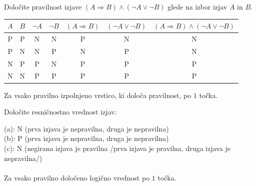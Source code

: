 \documentclass[addpoints]{exam}
\begin{document}
\begin{questions}

    
    \question[4]
    Določite pravilnost izjave $(A\Rightarrow  B)\land (\lnot A\lor \lnot B)$ glede na izbor izjav $A$ in $B$.

    \begin{solution}[8cm]
        \begin{table}[H]
            \begin{tabular}{ccccccc}
             $A$ & $B$ & $\lnot A$ & $\lnot B$ & $(A\Rightarrow B)$ & $(\lnot A\lor \lnot B)$ & $(A\Rightarrow B)\land(\lnot A\lor \lnot B)$\\ \hline
             P & P & N & N & P & N & N \\ 
             P & N & N & P & N & P & N \\
             N & P & P & N & P & P & P \\
             N & N & P & P & P & P & P
            \end{tabular}
        \end{table}
        Za vsako pravilno izpolnjeno vrstico, ki določa pravilnost, po $1$ točka.
    \end{solution}




    \question[3]
    Določite resničnostno vrednost izjav:

    \begin{solution}
        (a): N (prva izjava je nepravilna, druga je nepravilna) \\
        (b): P (prva izjava je nepravilna, druga je nepravilna) \\
        (c): N (negirana izjava je pravilna /prva izjava je pravilna, druga izjava je nepravilna/) \\ \\
        Za vsako pravilno določeno logično vrednost po $1$ točka.
    \end{solution}




\end{questions}
\end{document}
